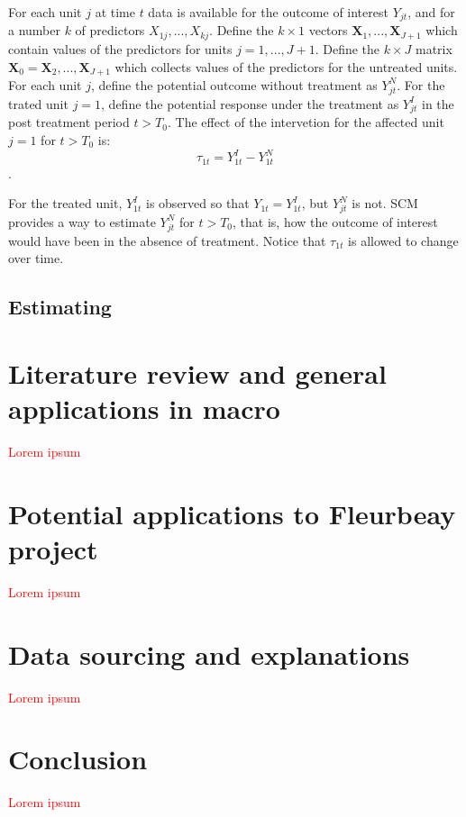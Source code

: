 \documentclass[12pt,a4paper,draft]{article}
\begin{document}
For each unit $j$ at time $t$ data is available for the outcome of interest 
$Y_{jt}$, and for a number $k$ of predictors $X_{1j}, ..., X_{kj}$. Define the 
$k \times 1$ vectors $\mathbf{X}_1, ..., \mathbf{X}_{J+1}$ which contain values
of the predictors for units $j=1,...,J+1$. Define the $k \times J$ matrix 
$\mathbf{X}_0={\mathbf{X}_2,..., \mathbf{X}_{J+1}}$ which collects values of the predictors 
for the untreated units.
For each unit $j$, define the potential outcome without treatment as $Y_{jt}^N$.
For the trated unit $j=1$, define the potential response under the treatment as 
$Y_{jt}^I$ in the post treatment period $t>T_0$. The effect of the intervetion 
for the affected unit $j=1$ for $t>T_0$ is: 
$$\tau_{1t}=Y_{1t}^I-Y_{1t}^N$$.

For the treated unit, $Y_{1t}^I$ is observed so that  $Y_{1t}=Y_{1t}^I$, but $Y_{jt}^N$ is not. 
SCM provides a way to estimate $Y_{jt}^N$ for $t>T_0$, that is, how the outcome 
of interest would have been in the absence of treatment. Notice that $\tau_{1t}$
is allowed to change over time.

\subsection{Estimating}








\section{Literature review and general applications in macro}
\textcolor{red}{Lorem ipsum}




\section{Potential applications to Fleurbeay project}
\textcolor{red}{Lorem ipsum}




\section{Data sourcing and explanations}
\textcolor{red}{Lorem ipsum}




\section{Conclusion}
\textcolor{red}{Lorem ipsum}
\end{document}
